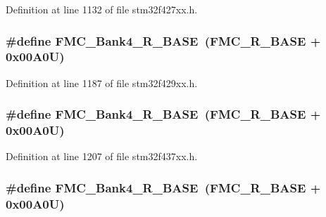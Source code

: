 Definition at line 1132 of file stm32f427xx.\+h.

\subsubsection[{\texorpdfstring{F\+M\+C\+\_\+\+Bank4\+\_\+\+R\+\_\+\+B\+A\+SE}{FMC_Bank4_R_BASE}}]{\setlength{\rightskip}{0pt plus 5cm}\#define F\+M\+C\+\_\+\+Bank4\+\_\+\+R\+\_\+\+B\+A\+SE~({\bf F\+M\+C\+\_\+\+R\+\_\+\+B\+A\+SE} + 0x00\+A0\+U)}\hypertarget{group___peripheral__memory__map_gadca715802374c00fafb6b4eb3e4d9a91}{}\label{group___peripheral__memory__map_gadca715802374c00fafb6b4eb3e4d9a91}


Definition at line 1187 of file stm32f429xx.\+h.

\subsubsection[{\texorpdfstring{F\+M\+C\+\_\+\+Bank4\+\_\+\+R\+\_\+\+B\+A\+SE}{FMC_Bank4_R_BASE}}]{\setlength{\rightskip}{0pt plus 5cm}\#define F\+M\+C\+\_\+\+Bank4\+\_\+\+R\+\_\+\+B\+A\+SE~({\bf F\+M\+C\+\_\+\+R\+\_\+\+B\+A\+SE} + 0x00\+A0\+U)}\hypertarget{group___peripheral__memory__map_gadca715802374c00fafb6b4eb3e4d9a91}{}\label{group___peripheral__memory__map_gadca715802374c00fafb6b4eb3e4d9a91}


Definition at line 1207 of file stm32f437xx.\+h.

\subsubsection[{\texorpdfstring{F\+M\+C\+\_\+\+Bank4\+\_\+\+R\+\_\+\+B\+A\+SE}{FMC_Bank4_R_BASE}}]{\setlength{\rightskip}{0pt plus 5cm}\#define F\+M\+C\+\_\+\+Bank4\+\_\+\+R\+\_\+\+B\+A\+SE~({\bf F\+M\+C\+\_\+\+R\+\_\+\+B\+A\+SE} + 0x00\+A0\+U)}\hypertarget{group___peripheral__memory__map_gadca715802374c00fafb6b4eb3e4d9a91}{}\label{group___peripheral__memory__map_gadca715802374c00fafb6b4eb3e4d9a91}


